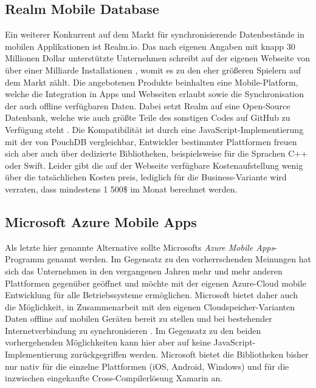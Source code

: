\subsection*{Realm Mobile Database}
Ein weiterer Konkurrent auf dem Markt für synchronisierende Datenbestände in mobilen Applikationen ist Realm.io. Das nach eigenen Angaben mit knapp 30 Millionen Dollar unterstützte Unternehmen schreibt auf der eigenen Webseite von über einer Milliarde Installationen \cite{realm:about}, womit es zu den eher größeren Spielern auf dem Markt zählt. Die angebotenen Produkte beinhalten eine Mobile-Platform, welche die Integration in Apps und Webseiten erlaubt sowie die Synchronisation der auch offline verfügbaren Daten. Dabei setzt Realm auf eine Open-Source Datenbank, welche wie auch größte Teile des sonstigen Codes auf GitHub zu Verfügung steht \cite{realm:githubrepo}. Die Kompatibilität ist durch eine JavaScript-Implementierung mit der von PouchDB vergleichbar, Entwickler bestimmter Plattformen freuen sich aber auch über dedizierte Bibliotheken, beispielsweise für die Sprachen C++ oder Swift. Leider gibt die auf der Webseite verfügbare Kostenaufstellung wenig über die tatsächlichen Kosten preis, lediglich für die Business-Variante wird verraten, dass mindestens 1 500\$ im Monat berechnet werden.

\subsection*{Microsoft Azure Mobile Apps}
Als letzte hier genannte Alternative sollte Microsofts \emph{Azure Mobile Apps}-Programm genannt werden. Im Gegensatz zu den vorherrschenden Meinungen hat sich das Unternehmen in den vergangenen Jahren mehr und mehr anderen Plattformen gegenüber geöffnet und möchte mit der eigenen Azure-Cloud mobile Entwicklung für alle Betriebssysteme ermöglichen.
Microsoft bietet daher auch die Möglichkeit, in Zusammenarbeit mit den eigenen Cloudspeicher-Varianten Daten offline auf mobilen Geräten bereit zu stellen und bei bestehender Internetverbindung zu synchronisieren \cite{microsoft:azuremobileappssync}. Im Gegensatz zu den beiden vorhergehenden Möglichkeiten kann hier aber auf keine JavaScript-Implementierung zurückgegriffen werden. Microsoft bietet die Bibliotheken bisher nur nativ für die einzelne Plattformen (iOS, Android, Windows) und für die inzwischen eingekaufte Cross-Compilerlösung Xamarin an.
